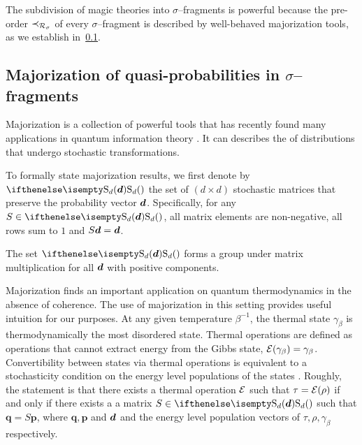 \documentclass[pra,
aps,
twocolumn,
superscriptaddress,
groupedaddress,
nofootinbib,
reprint
]{revtex4-1}
\begin{document}
The subdivision of magic theories into $\sigma$--fragments is powerful because the pre-order $\prec_{\mathcal{R}_\sigma}$ of every $\sigma$--fragment is described by well-behaved majorization tools, as we establish in~\cref{sec:major}.

\subsection{Majorization of quasi-probabilities in $\sigma$--fragments}\label{sec:major}

Majorization is a collection of powerful tools that has recently found many applications in quantum information theory .
It can describes the  of distributions that undergo stochastic transformations.

To formally state majorization results, we first denote by $\stoch$ the set of $(d \times d)$ stochastic matrices that preserve the probability vector $\bm{d}$. 
Specifically, for any $S \in \stoch$, all matrix elements are non-negative, all rows sum to $1$ and $S\bm{d} = \bm{d}$.

The set $\stoch$ forms a group under matrix multiplication for all $\bm{d}$ with positive components.

Majorization finds an important application on quantum thermodynamics in the absence of coherence.
The use of majorization in this setting provides useful intuition for our purposes.
At any given temperature $\beta^{-1}$, the thermal state $\gamma_\beta$ is thermodynamically the most disordered state. 
Thermal operations are defined as operations that cannot extract energy from the Gibbs state, $\mathcal{E}(\gamma_\beta) = \gamma_\beta$.
Convertibility between states via thermal operations is equivalent to a stochasticity condition on the energy level populations of the states .
Roughly, the statement is that there exists a thermal operation $\mathcal{E}$ such that $\tau = \mathcal{E}(\rho)$ if and only if there exists a a matrix $S \in \stoch$ such that $\bm{q} = S\bm{p}$, where $\bm{q}, \bm{p}$ and $\bm{d}$ and the energy level population vectors of $\tau, \rho, \gamma_\beta$ respectively.
\end{document}
